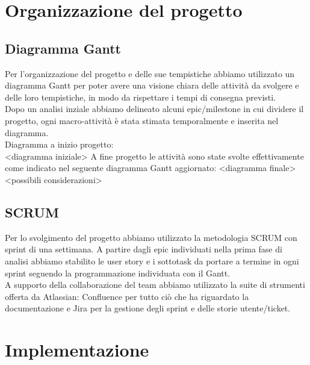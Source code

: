 \documentclass{article}
\begin{document}
\section{Organizzazione del progetto}
\subsection{Diagramma Gantt}
Per l’organizzazione del progetto e delle sue tempistiche abbiamo utilizzato un diagramma Gantt per poter avere una visione chiara delle attività
da svolgere e delle loro tempistiche, in modo da rispettare i tempi di consegna previsti.\\
Dopo un analisi inziale abbiamo delineato alcuni epic/milestone in cui dividere il progetto, ogni macro-attività è stata stimata temporalmente e
inserita nel diagramma.\\
Diagramma a inizio progetto:\\
<diagramma iniziale>
A fine progetto le attività sono state svolte effettivamente come indicato nel seguente diagramma Gantt aggiornato:
<diagramma finale>
<possibili considerazioni>

\subsection{SCRUM}
Per lo svolgimento del progetto abbiamo utilizzato la metodologia SCRUM con sprint di una settimana. A partire dagli epic individuati nella prima fase di analisi abbiamo stabilito le user story e i sottotask da portare a termine in ogni sprint seguendo la programmazione individuata con il Gantt.\\
A supporto della collaborazione del team abbiamo utilizzato la suite di strumenti offerta da Atlassian: Confluence per tutto ciò che ha riguardato la documentazione e Jira per la gestione degli sprint e delle storie utente/ticket.
\clearpage
\section{Implementazione}
\end{document}
